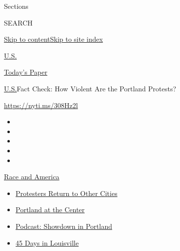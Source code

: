 Sections

SEARCH

\protect\hyperlink{site-content}{Skip to
content}\protect\hyperlink{site-index}{Skip to site index}

\href{https://www.nytimes3xbfgragh.onion/section/us}{U.S.}

\href{https://myaccount.nytimes3xbfgragh.onion/auth/login?response_type=cookie\&client_id=vi}{}

\href{https://www.nytimes3xbfgragh.onion/section/todayspaper}{Today's
Paper}

\href{/section/us}{U.S.}\textbar{}Fact Check: How Violent Are the
Portland Protests?

\url{https://nyti.ms/308Hz2l}

\begin{itemize}
\item
\item
\item
\item
\item
\end{itemize}

\href{https://www.nytimes3xbfgragh.onion/news-event/george-floyd-protests-minneapolis-new-york-los-angeles?action=click\&pgtype=Article\&state=default\&region=TOP_BANNER\&context=storylines_menu}{Race
and America}

\begin{itemize}
\tightlist
\item
  \href{https://www.nytimes3xbfgragh.onion/2020/07/26/us/protests-portland-seattle-trump.html?action=click\&pgtype=Article\&state=default\&region=TOP_BANNER\&context=storylines_menu}{Protesters
  Return to Other Cities}
\item
  \href{https://www.nytimes3xbfgragh.onion/2020/07/24/us/portland-oregon-protests-white-race.html?action=click\&pgtype=Article\&state=default\&region=TOP_BANNER\&context=storylines_menu}{Portland
  at the Center}
\item
  \href{https://www.nytimes3xbfgragh.onion/2020/07/23/podcasts/the-daily/portland-protests.html?action=click\&pgtype=Article\&state=default\&region=TOP_BANNER\&context=storylines_menu}{Podcast:
  Showdown in Portland}
\item
  \href{https://www.nytimes3xbfgragh.onion/interactive/2020/07/16/us/black-lives-matter-protests-louisville-breonna-taylor.html?action=click\&pgtype=Article\&state=default\&region=TOP_BANNER\&context=storylines_menu}{45
  Days in Louisville}
\end{itemize}

